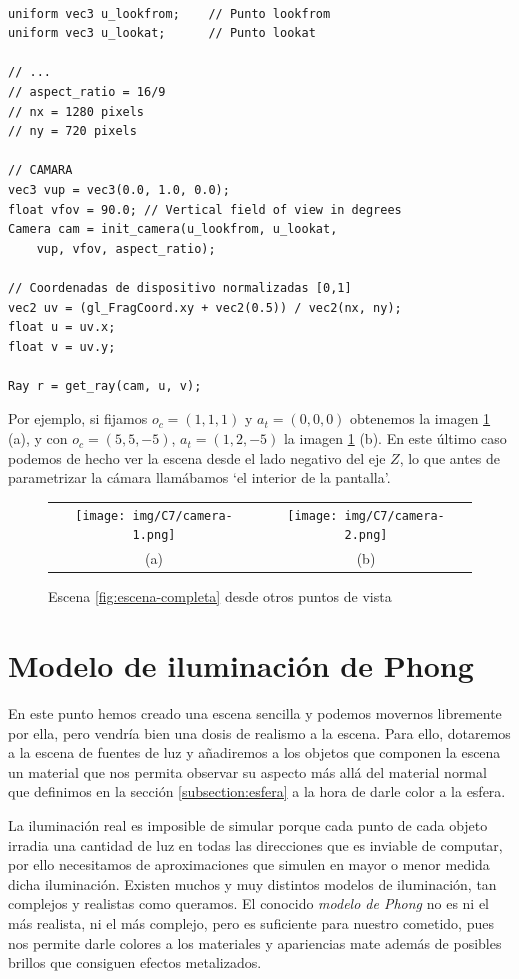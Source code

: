 \begin{lstlisting}

uniform vec3 u_lookfrom;    // Punto lookfrom
uniform vec3 u_lookat;      // Punto lookat

// ... 
// aspect_ratio = 16/9
// nx = 1280 pixels
// ny = 720 pixels

// CAMARA
vec3 vup = vec3(0.0, 1.0, 0.0);
float vfov = 90.0; // Vertical field of view in degrees
Camera cam = init_camera(u_lookfrom, u_lookat, 
    vup, vfov, aspect_ratio);

// Coordenadas de dispositivo normalizadas [0,1]
vec2 uv = (gl_FragCoord.xy + vec2(0.5)) / vec2(nx, ny);
float u = uv.x;
float v = uv.y;

Ray r = get_ray(cam, u, v);
\end{lstlisting}

Por ejemplo, si fijamos $o_c = (1,1,1)$ y $a_t = (0,0,0)$ obtenemos la imagen \ref{fig:escena-camara} (a), y con $o_c=(5, 5, -5)$, $a_t=(1,2,-5)$ la imagen \ref{fig:escena-camara} (b). En este último caso podemos de hecho ver la escena desde el lado negativo del eje $Z$, lo que antes de parametrizar la cámara llamábamos `el interior de la pantalla'.

\begin{figure}[ht]
    \centering
    \begin{tabular}{cc}
          \texttt{[image: img/C7/camera-1.png]} &   \texttt{[image: img/C7/camera-2.png]} \\
    (a) & (b)\\[6pt]
    \end{tabular}
    \caption{Escena \ref{fig:escena-completa} desde otros puntos de vista}
    \label{fig:escena-camara}
\end{figure}

\section{Modelo de iluminación de Phong}
\label{section:Phong}
En este punto hemos creado una escena sencilla y podemos movernos libremente por ella, pero vendría bien una dosis de realismo a la escena. Para ello, dotaremos a la escena de fuentes de luz y añadiremos a los objetos que componen la escena un material que nos permita observar su aspecto más allá del material normal que definimos en la sección \ref{subsection:esfera} a la hora de darle color a la esfera.

La iluminación real es imposible de simular porque cada punto de cada objeto irradia una cantidad de luz en todas las direcciones que es inviable de computar, por ello necesitamos de aproximaciones que simulen en mayor o menor medida dicha iluminación. Existen muchos y muy distintos modelos de iluminación, tan complejos y realistas como queramos. El conocido \textit{modelo de Phong} no es ni el más realista, ni el más complejo, pero es suficiente para nuestro cometido, pues nos permite darle colores a los materiales y apariencias mate además de posibles brillos que consiguen efectos metalizados.


